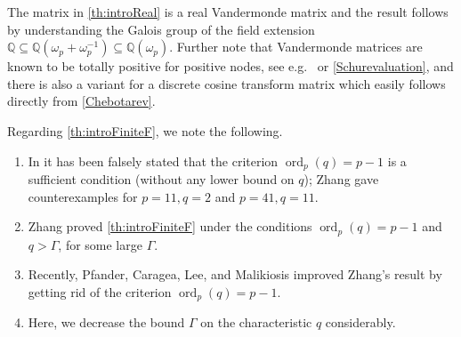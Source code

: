 \documentclass[a4paper]{article}
\newcommand{\N}{\ensuremath{\mathbb{N}}}
\renewcommand{\o}{\omega}
\newcommand{\Q}{\ensuremath{\mathbb{Q}}}
\newcommand{\F}{\mathbb{F}}
\newcommand{\ord}{\operatorname{ord}}
\numberwithin{equation}{section}
\numberwithin{table}{section}
\numberwithin{figure}{section}
\begin{document}
The matrix in \cref{th:introReal} is a real Vandermonde matrix and the result follows by understanding the Galois group of the field extension $\Q \subseteq \Q(\o_p+\o_{p}^{-1}) \subseteq \Q(\o_p)$.
Further note that Vandermonde matrices are known to be totally positive for positive nodes, see e.g.~\cite{Pi10} or \cref{Schurevaluation}, and there is also a variant for a discrete cosine transform matrix which easily follows directly from \cref{Chebotarev}. 

Regarding \cref{th:introFiniteF}, we note the following.
\begin{enumerate}
    \item In \cite{FiniteFieldChebFalse} it has been falsely stated that the criterion $\ord_p(q)=p-1$ is a sufficient condition (without any lower bound on $q$);
    Zhang \cite[Example 4.1,4.2]{Zhang} gave counterexamples for $p=11, q=2$ and $p=41, q=11$.
    \item Zhang \cite[Theorem A]{Zhang} proved \cref{th:introFiniteF} under the conditions $\ord_p(q)=p-1$ and $q > \Gamma$, for some large $\Gamma$.
    \item Recently, Pfander, Caragea, Lee, and Malikiosis \cite{PfCaLeMa25} improved Zhang's result by getting rid of the criterion $\ord_p(q)=p-1$.
    \item Here, we decrease the bound $\Gamma$ on the characteristic $q$ considerably.
\end{enumerate}


\end{document}
